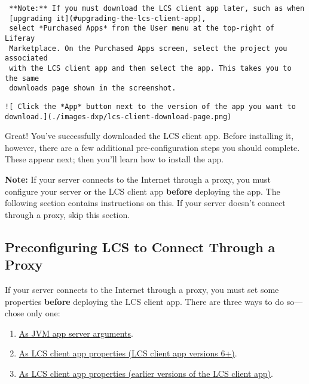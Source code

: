 \noindent\hrulefill

\begin{verbatim}
 **Note:** If you must download the LCS client app later, such as when
 [upgrading it](#upgrading-the-lcs-client-app),
 select *Purchased Apps* from the User menu at the top-right of Liferay
 Marketplace. On the Purchased Apps screen, select the project you associated
 with the LCS client app and then select the app. This takes you to the same
 downloads page shown in the screenshot.
\end{verbatim}

\noindent\hrulefill

\begin{verbatim}
![ Click the *App* button next to the version of the app you want to download.](./images-dxp/lcs-client-download-page.png)
\end{verbatim}

Great! You've successfully downloaded the LCS client app. Before
installing it, however, there are a few additional pre-configuration
steps you should complete. These appear next; then you'll learn how to
install the app.

\noindent\hrulefill

\textbf{Note:} If your server connects to the Internet through a proxy,
you must configure your server or the LCS client app \textbf{before}
deploying the app. The following section contains instructions on this.
If your server doesn't connect through a proxy, skip this section.

\noindent\hrulefill

\subsection{Preconfiguring LCS to Connect Through a
Proxy}\label{preconfiguring-lcs-to-connect-through-a-proxy}

If your server connects to the Internet through a proxy, you must set
some properties \textbf{before} deploying the LCS client app. There are
three ways to do so---chose only one:

\begin{enumerate}
\def\labelenumi{\arabic{enumi}.}
\item
  \hyperref[jvm-app-server-arguments]{As JVM app server arguments}.
\item
  \hyperref[lcs-client-app-properties-versions-6]{As LCS client app
  properties (LCS client app versions 6+)}.
\item
  \hyperref[lcs-client-app-properties-earlier-versions]{As LCS client
  app properties (earlier versions of the LCS client app)}.
\end{enumerate}

